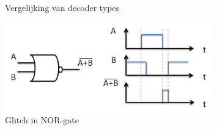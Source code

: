 \begin{figure}[!ht]
\centering
{}
\\
\caption[Vergelijking van decoder types]{Vergelijking van decoder types}
\end{figure}



\begin{figure}[!ht]
  \centering
  \includegraphics[width=0.8\textwidth]{../fig/hfdst-decoders-glitch.png}
  \caption[Glitch in NOR-gate]{Glitch in NOR-gate}
  \label{fig:decoder_glitch}
\end{figure}


